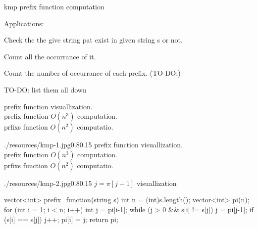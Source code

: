 \begin{problem}{kmp prefix function computation}

    Applications:
    \begin{asparaenum}
        \item Check the the give string pat exist in given string s or not.
        \item Count all the occurrance of it.
        \item Count the number of occurrance of each prefix. (TO-DO:)
        \item TO-DO: list them all down
    \end{asparaenum}
\end{problem}



\begin{solution}[BruteForce | $O(n^3), O(n^2)$]

    prefix function visuallization.\\
    prefix function $O(n^3)$ computation.\\
    prfixs function $O(n^2)$ computatio.

    \begin{lfigure}{./resources/kmp-1.jpg}{0.80}{.15}
        prefix function visuallization.\\
        prefix function $O(n^3)$ computation.\\
        prfixs function $O(n^2)$ computatio.

    \end{lfigure}
\end{solution}

\begin{solution}


    \begin{lfigure}{./resources/kmp-2.jpg}{0.80}{.15}
       $j = \pi[j-1]$ visuallization
    \end{lfigure}


\begin{code3}
vector<int> prefix_function(string s) {
    int n = (int)s.length();
    vector<int> pi(n);
    for (int i = 1; i < n; i++) {
        int j = pi[i-1];
        while (j > 0 && s[i] != s[j])
            j = pi[j-1];
        if (s[i] == s[j])
            j++;
        pi[i] = j;
    }
    return pi;
}
    \end{code3}
\end{solution}